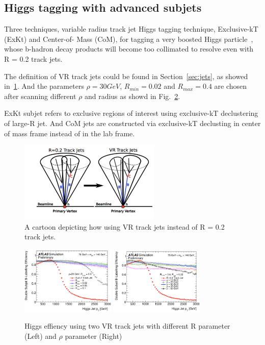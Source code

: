 \subsection{Higgs tagging with advanced subjets}

\par Three techniques, variable radius track jet Higgs tagging technique, Exclusive-kT (ExKt) and Center-of- Mass (CoM), for tagging a very boosted Higgs 
particle~\cite{ATL-PHYS-PUB-2017-010}, 
whose b-hadron decay products will become too collimated to resolve even with R = 0.2 track jets.
\par The definition of VR track jets could be found in Section~\ref{sec:jets}, as showed in~\ref{fig:vr}. And the parameters $\rho = 30 GeV$, $R_{min} = 0.02$ and $R_{max} = 0.4$ 
are chosen after scanning different $\rho$ and radius as showd in Fig.~\ref{fig:vr-scan}.


ExKt subjet refers to exclusive regions of interest using exclusive-kT declustering of large-R jet. 
And CoM jets are constructed via exclusive-kT declusting in center of mass frame instead of in the lab frame.
\begin{figure}[htbp]
    \centering
    \includegraphics[width=0.6\textwidth]{chapters/c5/figures/VR}
    \caption{A cartoon depicting how using VR track jets instead of R = 0.2 track jets.}
    \label{fig:vr}
\end{figure}

\begin{figure}[htbp]
    \centering
    \includegraphics[width=0.4\textwidth]{chapters/c5/figures/r-vr}
    \includegraphics[width=0.4\textwidth]{chapters/c5/figures/rho-vr}
    \caption{Higgs effiency using two VR track jets with different R parameter (Left) and $\rho$ parameter (Right)} 
    \label{fig:vr-scan}
\end{figure}

